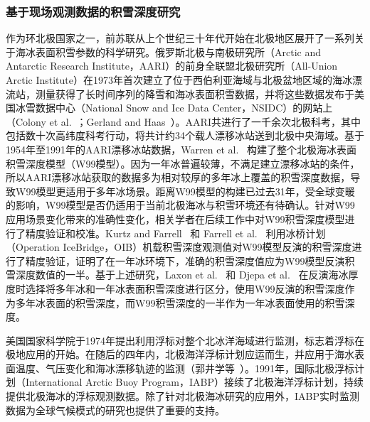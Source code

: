 \subsubsection{基于现场观测数据的积雪深度研究}
作为环北极国家之一，前苏联从上个世纪三十年代开始在北极地区展开了一系列关于海冰表面积雪参数的科学研究。俄罗斯北极与南极研究所（Arctic and Antarctic Research Institute，AARI）的前身全联盟北极研究所（All-Union Arctic Institute）在1973年首次建立了位于西伯利亚海域与北极盆地区域的海冰漂流站，测量获得了长时间序列的降雪和海冰表面积雪数据，并将这些数据发布于美国冰雪数据中心（National Snow and Ice Data Center，NSIDC）的网站上（Colony et al.~\cite{colony1998}；Gerland and Haas~\cite{gerland2011}）。AARI共进行了一千余次北极科考，其中包括数十次高纬度科考行动，将共计约34个载人漂移冰站送到北极中央海域。基于1954年至1991年的AARI漂移冰站数据，Warren et al.~\cite{warren1999} 构建了整个北极海冰表面积雪深度模型（W99模型）。因为一年冰普遍较薄，不满足建立漂移冰站的条件，所以AARI漂移冰站获取的数据多为相对较厚的多年冰上覆盖的积雪深度数据，导致W99模型更适用于多年冰场景。距离W99模型的构建已过去31年，受全球变暖的影响，W99模型是否仍适用于当前北极海冰与积雪环境还有待确认。针对W99应用场景变化带来的准确性变化，相关学者在后续工作中对W99积雪深度模型进行了精度验证和校准。Kurtz and Farrell~\cite{kurtz_farrell2011} 和 Farrell et al.~\cite{farrell2012} 利用冰桥计划（Operation IceBridge，OIB）机载积雪深度观测值对W99模型反演的积雪深度进行了精度验证，证明了在一年冰环境下，准确的积雪深度值应为W99模型反演积雪深度数值的一半。基于上述研究，Laxon et al.~\cite{laxon2013} 和 Djepa et al.~\cite{djepa2014} 在反演海冰厚度时选择将多年冰和一年冰表面积雪深度进行区分，使用W99反演的积雪深度作为多年冰表面的积雪深度，而W99积雪深度的一半作为一年冰表面使用的积雪深度。

美国国家科学院于1974年提出利用浮标对整个北冰洋海域进行监测，标志着浮标在极地应用的开始。在随后的四年内，北极海洋浮标计划应运而生，并应用于海水表面温度、气压变化和海冰漂移轨迹的监测（郭井学等~\cite{guo2011}）。1991年，国际北极浮标计划（International Arctic Buoy Program，IABP）接续了北极海洋浮标计划，持续提供北极海冰的浮标观测数据。除了针对北极海冰研究的应用外，IABP实时监测数据为全球气候模式的研究也提供了重要的支持。

